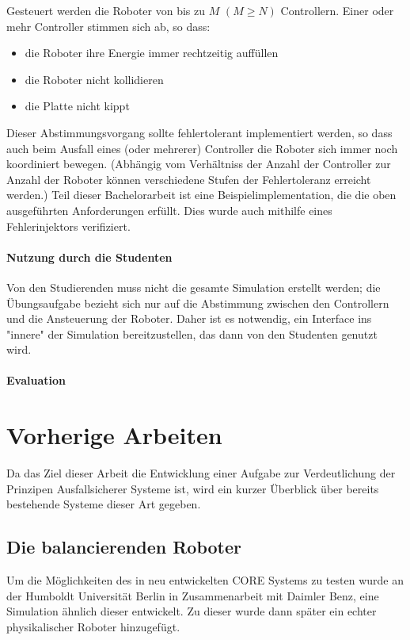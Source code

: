 \documentclass[
    12pt,
    bibliography=totoc,
    ngerman,
	enabledeprecatedfontcommands
]{scrartcl}
\begin{document}
Gesteuert werden die Roboter von bis zu $M$ $(M \geq N)$ Controllern. Einer oder mehr Controller stimmen sich ab,
so dass:
\begin{itemize}
\item die Roboter ihre Energie immer rechtzeitig auff{\"{u}}llen
\item die Roboter nicht kollidieren
\item die Platte nicht kippt
\end{itemize}

Dieser Abstimmungsvorgang sollte fehlertolerant implementiert werden, so dass auch beim Ausfall eines (oder mehrerer) Controller die Roboter sich immer noch koordiniert bewegen. (Abh{\"{a}}ngig vom Verh{\"{a}}ltniss der Anzahl der Controller zur
Anzahl der Roboter k{\"{o}}nnen verschiedene Stufen der Fehlertoleranz erreicht werden.\cite[s.149]{Werner00})
Teil dieser Bachelorarbeit ist eine
Beispielimplementation, die die oben ausgef{\"{u}}hrten Anforderungen erf{\"{u}}llt. Dies wurde auch mithilfe eines Fehlerinjektors verifiziert.

\paragraph{Nutzung durch die Studenten} Von den Studierenden muss nicht die gesamte Simulation erstellt werden; die {\"{U}}bungsaufgabe bezieht sich nur auf die Abstimmung zwischen den Controllern und die Ansteuerung der Roboter.
Daher ist es notwendig, ein Interface ins "innere" der Simulation bereitzustellen, das dann von den Studenten genutzt wird.

\paragraph{Evaluation} 


\clearpage
\section{Vorherige Arbeiten}
Da das Ziel dieser Arbeit die Entwicklung einer Aufgabe zur Verdeutlichung der Prinzipen Ausfallsicherer Systeme ist, wird ein kurzer {\"{U}}berblick {\"{u}}ber bereits bestehende Systeme dieser Art gegeben.

\subsection{Die balancierenden Roboter}
Um die M{\"{o}}glichkeiten des in \cite{Werner00} neu entwickelten CORE Systems zu testen wurde an der Humboldt Universit{\"{a}}t Berlin in Zusammenarbeit
mit Daimler Benz, eine Simulation {\"{a}}hnlich dieser entwickelt. Zu dieser wurde dann sp{\"{a}}ter ein echter physikalischer Roboter hinzugef{\"{u}}gt.
\end{document}
